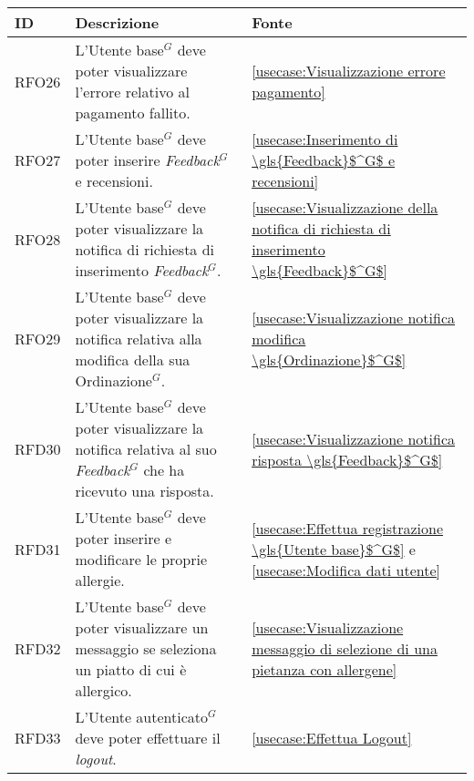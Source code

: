 \begin{table}[H]
	\renewcommand{\arraystretch}{1.5}
	\centering
	\begin{tabularx}{\textwidth}{l|X|p{2cm}}
		\textbf{ID} & \textbf{Descrizione}                                                                                              & \textbf{Fonte}                                                                        \\
		\hline
		RFO26       & L'\gls{Utente base}$^G$ deve poter visualizzare l'errore relativo al pagamento fallito.                                     & \autoref{usecase:Visualizzazione errore pagamento}                                    \\
		\hline
		RFO27       & L'\gls{Utente base}$^G$ deve poter inserire \textit{\gls{Feedback}$^G$} e recensioni.                                                 & \autoref{usecase:Inserimento di \gls{Feedback}$^G$ e recensioni}                                \\
		\hline
		RFO28       & L'\gls{Utente base}$^G$ deve poter visualizzare la notifica di richiesta di inserimento \textit{\gls{Feedback}$^G$}.                  & \autoref{usecase:Visualizzazione della notifica di richiesta di inserimento \gls{Feedback}$^G$} \\
		\hline
		RFO29       & L'\gls{Utente base}$^G$ deve poter visualizzare la notifica relativa alla modifica della sua \gls{Ordinazione}$^G$.                   & \autoref{usecase:Visualizzazione notifica modifica \gls{Ordinazione}$^G$}                       \\
		\hline
		RFD30       & L'\gls{Utente base}$^G$ deve poter visualizzare la notifica relativa al suo \textit{\gls{Feedback}$^G$} che ha ricevuto una risposta. & \autoref{usecase:Visualizzazione notifica risposta \gls{Feedback}$^G$}                          \\
		\hline
		RFD31       & L'\gls{Utente base}$^G$ deve poter inserire e modificare le proprie allergie. 												& \autoref{usecase:Effettua registrazione \gls{Utente base}$^G$} e \autoref{usecase:Modifica dati utente}                      \\
		\hline
		RFD32       & L'\gls{Utente base}$^G$ deve poter visualizzare un messaggio se seleziona un piatto di cui è allergico. 					& \autoref{usecase:Visualizzazione messaggio di selezione di una pietanza con allergene}                      \\
		\hline
		RFD33       & L'\gls{Utente autenticato}$^G$ deve poter effettuare il \textit{logout}.                                                    & \autoref{usecase:Effettua Logout}                                                     \\

\end{tabularx}
\end{table}
